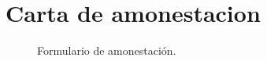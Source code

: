 \appendix
\pagestyle{formato-PI}
\renewcommand{\MayorVer}{1}
\renewcommand{\MenorVer}{0}
\renewcommand{\Codigo}{BPD-AP-A}
\renewcommand{\FechaPub}{2023--01}
\renewcommand{\Titulo}{Carta de amonestacion}

\section{\Titulo}
\label{AP1}
\begin{figure}[!ht]
	\centering
    \label{F-amonest}
	\caption{Formulario de amonestación.}
\end{figure}